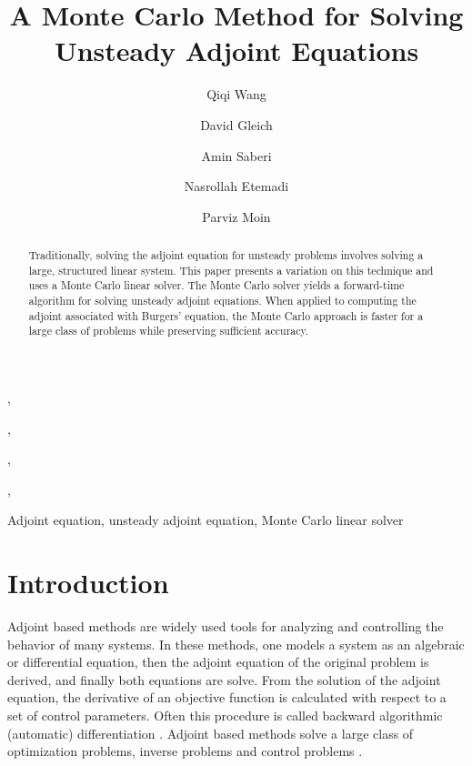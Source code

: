 \documentclass{elsart}
\theoremstyle{remark}
\theoremstyle{definition}
\theoremstyle{proof}
\begin{document}
\begin{frontmatter}

\title{A Monte Carlo Method for Solving Unsteady Adjoint Equations}
\author[icme]{Qiqi Wang},
\author[icme]{David Gleich},
\author[icme]{Amin Saberi},
\author[ctr]{Nasrollah Etemadi},
\author[ctr]{Parviz Moin}
\address[icme]{Institute of Computational and Mathematical Engineering,
Stanford University, Stanford, CA 94305, USA}
\address[ctr]{Center for Turbulence Research,
Stanford University, Stanford, CA 94305, USA}

\begin{abstract}
    Traditionally, solving the adjoint equation for unsteady problems involves
    solving a large, structured linear system.  This paper presents a variation
    on this technique and uses a Monte Carlo linear solver.  The Monte Carlo
    solver yields a forward-time algorithm for solving unsteady adjoint
    equations.  When applied to computing the adjoint associated with Burgers'
    equation, the Monte Carlo approach is faster for a large class of problems
    while preserving sufficient accuracy.
\end{abstract}
\begin{keyword}
    Adjoint equation, unsteady adjoint equation, Monte Carlo linear solver
\end{keyword}
\end{frontmatter}




\section{Introduction}
    Adjoint based methods are widely used tools for analyzing and
    controlling the behavior of many systems.  In these methods, one models a
    system as an algebraic or differential equation, then the adjoint equation
    of the original problem is derived, and finally both equations are solve.
    From the solution of the adjoint equation, the derivative of an objective
    function is calculated with respect to a set of control parameters.  Often
    this procedure is called backward algorithmic (automatic) differentiation
    \cite{Griewank2003}.  Adjoint based methods solve a large class of
    optimization problems, inverse problems and control problems
    \cite{Bewley2001} \cite{Choi1993} \cite{Giles2000} \cite{Gunzburger1999} 
    \cite{Gunzburger2000} \cite{Jameson1988}.
    
\end{document}
